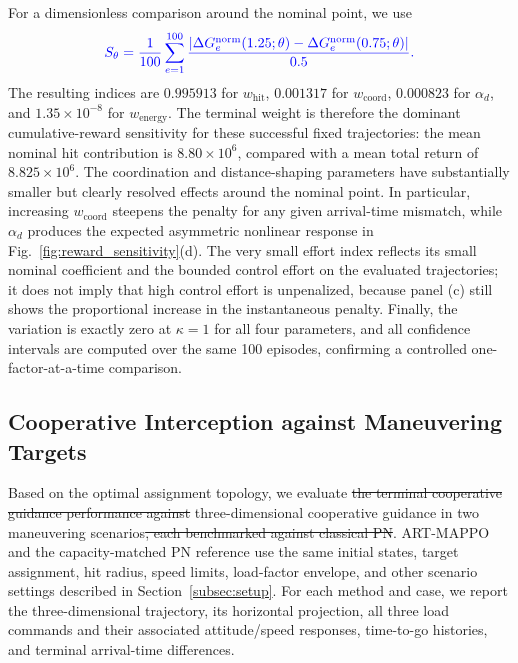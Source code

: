\documentclass[lettersize,journal]{IEEEtran}
\providecommand{\DIFadd}[1]{{\protect\color{blue}#1}} %
\providecommand{\DIFdel}[1]{{\protect\color{red}\sout{#1}}}                      %
\providecommand{\DIFaddbegin}{} %
\providecommand{\DIFaddend}{} %
\providecommand{\DIFdelbegin}{} %
\providecommand{\DIFdelend}{} %
\newcommand{\DIFscaledelfig}{0.5}
\newlength{\DIFdelgraphicswidth} %
\newlength{\DIFdelgraphicsheight} %
\newcommand{\DIFaddincludegraphics}[2][]{{\color{blue}\fbox{\DIFOincludegraphics[#1]{#2}}}} %
\newcommand{\DIFdelincludegraphics}[2][]{%
\sbox{\DIFdelgraphicsbox}{\DIFOincludegraphics[#1]{#2}}%
\settoboxwidth{\DIFdelgraphicswidth}{\DIFdelgraphicsbox} %
\settoboxtotalheight{\DIFdelgraphicsheight}{\DIFdelgraphicsbox} %
\scalebox{\DIFscaledelfig}{%
\parbox[b]{\DIFdelgraphicswidth}{\usebox{\DIFdelgraphicsbox}\\[-\baselineskip] \rule{\DIFdelgraphicswidth}{0em}}\llap{\resizebox{\DIFdelgraphicswidth}{\DIFdelgraphicsheight}{%
\setlength{\unitlength}{\DIFdelgraphicswidth}%
\begin{picture}(1,1)%
\thicklines\linethickness{2pt} %
{\color[rgb]{1,0,0}\put(0,0){\framebox(1,1){}}}%
{\color[rgb]{1,0,0}\put(0,0){\line( 1,1){1}}}%
{\color[rgb]{1,0,0}\put(0,1){\line(1,-1){1}}}%
\end{picture}%
}\hspace*{3pt}}} %
} %
\DeclareRobustCommand{\DIFaddbegin}{\DIFOaddbegin \let\includegraphics\DIFaddincludegraphics} %
\DeclareRobustCommand{\DIFaddend}{\DIFOaddend \let\includegraphics\DIFOincludegraphics} %
\DeclareRobustCommand{\DIFdelbegin}{\DIFOdelbegin \let\includegraphics\DIFdelincludegraphics} %
\DeclareRobustCommand{\DIFdelend}{\DIFOaddend \let\includegraphics\DIFOincludegraphics} %
\begin{document}
\DIFadd{For a dimensionless comparison around the nominal point, we use
}\begin{equation}
\DIFadd{\label{eq:local_reward_sensitivity}
S_{\theta}=\frac{1}{100}\sum_{e=1}^{100}
\frac{\left|\Delta G_e^{\mathrm{norm}}(1.25;\theta)
-\Delta G_e^{\mathrm{norm}}(0.75;\theta)\right|}{0.5}.
}\end{equation}
\DIFadd{The resulting indices are $0.995913$ for $w_{\mathrm{hit}}$, $0.001317$ for
$w_{\mathrm{coord}}$, $0.000823$ for $\alpha_d$, and
$1.35\times10^{-8}$ for $w_{\mathrm{energy}}$. The terminal weight is therefore the
dominant cumulative-reward sensitivity for these successful fixed trajectories: the mean
nominal hit contribution is $8.80\times10^6$, compared with a mean total return of
$8.825\times10^6$. The coordination and distance-shaping parameters have substantially
smaller but clearly resolved effects around the nominal point. In particular, increasing
$w_{\mathrm{coord}}$ steepens the penalty for any given arrival-time mismatch, while
$\alpha_d$ produces the expected asymmetric nonlinear response in
Fig.~\ref{fig:reward_sensitivity}(d). The very small effort index reflects its small nominal
coefficient and the bounded control effort on the evaluated trajectories; it does not imply
that high control effort is unpenalized, because panel (c) still shows the proportional
increase in the instantaneous penalty. Finally, the variation is exactly zero at
$\kappa=1$ for all four parameters, and all confidence intervals are computed over the same
100 episodes, confirming a controlled one-factor-at-a-time comparison.
}\DIFaddend 

\subsection{Cooperative Interception against Maneuvering Targets}
\label{subsec:cases}

Based on the optimal assignment topology, we evaluate \DIFdelbegin \DIFdel{the terminal cooperative guidance
performance against }\DIFdelend \DIFaddbegin \DIFadd{three-dimensional cooperative guidance
in }\DIFaddend two maneuvering scenarios\DIFdelbegin \DIFdel{, each benchmarked against classical PN}\DIFdelend \DIFaddbegin \DIFadd{. ART-MAPPO and the capacity-matched PN reference use the same
initial states, target assignment, hit radius, speed limits, load-factor envelope, and other
scenario settings described in Section~\ref{subsec:setup}. For each
method and case, we report the three-dimensional trajectory, its horizontal projection, all
three load commands and their associated attitude/speed responses, time-to-go histories, and
terminal arrival-time differences}\DIFaddend .
\end{document}
